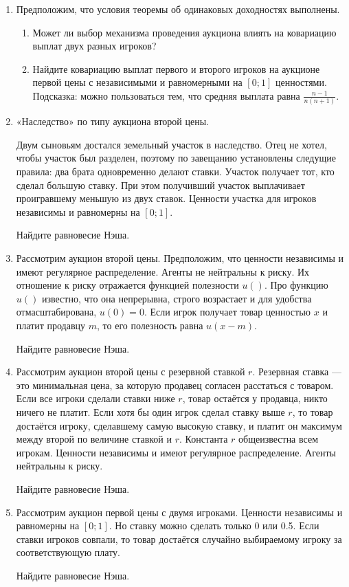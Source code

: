 

\begin{enumerate}
\item Предположим, что условия теоремы об одинаковых доходностях выполнены.
\begin{enumerate}
\item Может ли выбор механизма проведения аукциона влиять на ковариацию выплат двух разных игроков?
\item  Найдите ковариацию выплат первого и второго игроков на аукционе первой цены с независимыми и равномерными на $ [0;1] $ ценностями. Подсказка: можно пользоваться тем, что средняя выплата равна $ \frac{n-1}{n(n+1)} $.
\end{enumerate}


\item «Наследство» по типу аукциона второй цены.

Двум сыновьям достался земельный участок в наследство. Отец не хотел, чтобы участок был разделен, поэтому по завещанию установлены следущие правила: два брата одновременно делают ставки. Участок получает тот, кто сделал большую ставку. При этом получивший участок выплачивает проигравшему меньшую из двух ставок. Ценности участка для игроков независимы и равномерны на $ [0;1] $.

Найдите равновесие Нэша.


\item Рассмотрим аукцион второй цены. Предположим, что ценности независимы и имеют регулярное распределение. Агенты не нейтральны к риску. Их отношение к риску отражается функцией полезности $ u() $. Про функцию $ u() $ известно, что она непрерывна, строго возрастает и для удобства отмасштабирована, $ u(0)=0 $. Если игрок получает товар ценностью $ x $ и платит продавцу $ m $, то его полезность равна $ u(x-m) $.

Найдите равновесие Нэша.



\item Рассмотрим аукцион второй цены с резервной ставкой $ r $. Резервная ставка — это минимальная цена, за которую продавец согласен расстаться с товаром. Если все игроки сделали ставки ниже $ r $, товар остаётся у продавца, никто ничего не платит. Если хотя бы один игрок сделал ставку выше $ r $, то товар достаётся игроку, сделавшему самую высокую ставку, и платит он максимум между второй по величине ставкой и $ r $. Константа $ r $ общеизвестна всем игрокам. Ценности независимы и имеют регулярное распределение. Агенты нейтральны к риску.

Найдите равновесие Нэша.


\item Рассмотрим аукцион первой цены с двумя игроками. Ценности независимы и равномерны на $ [0;1] $. Но ставку можно сделать только 0 или 0.5. Если ставки игроков совпали, то товар достаётся случайно выбираемому игроку за соответствующую плату.

Найдите равновесие Нэша.

\end{enumerate}
